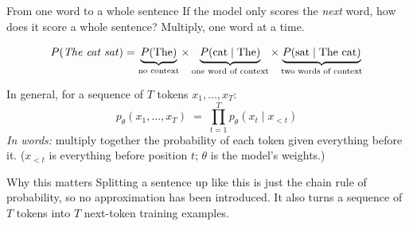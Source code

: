 \documentclass[aspectratio=169,10pt]{beamer}
\begin{document}
\begin{frame}[shrink=12]{From one word to a whole sentence}
  If the model only scores the \emph{next} word, how does it score a whole
  sentence? Multiply, one word at a time.

  \vspace{0.3em}
  \footnotesize
  \[
    P(\text{\textit{The cat sat}})
    = \underbrace{P(\text{The})}_{\text{no context}}
    \times \underbrace{P(\text{cat}\mid\text{The})}_{\text{one word of context}}
    \times \underbrace{P(\text{sat}\mid\text{The cat})}_{\text{two words of context}}
  \]
  \normalsize

  \vspace{0.2em}
  In general, for a sequence of $T$ tokens $x_1,\dots,x_T$:
  \[
    p_\theta(x_1,\dots,x_T) \;=\; \prod_{t=1}^{T} p_\theta\!\left(x_t \mid x_{<t}\right)
  \]
  \emph{In words:} multiply together the probability of each token given
  everything before it. ($x_{<t}$ is everything before position $t$;
  $\theta$ is the model's weights.)

  \vfill
  \begin{block}{Why this matters}
    Splitting a sentence up like this is just the chain rule of probability,
    so no approximation has been introduced. It also turns a sequence of $T$
    tokens into $T$ next-token training examples.
  \end{block}
\end{frame}
\end{document}
